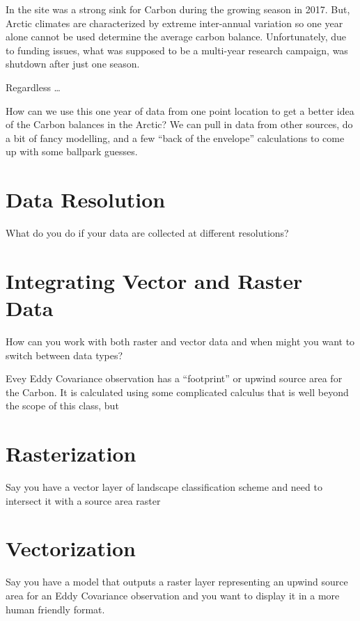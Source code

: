 \documentclass[
]{book}
\begin{document}
In the site was a strong sink for Carbon during the growing season in 2017. But, Arctic climates are characterized by extreme inter-annual variation so one year alone cannot be used determine the average carbon balance. Unfortunately, due to funding issues, what was supposed to be a multi-year research campaign, was shutdown after just one season.

Regardless \ldots{}

How can we use this one year of data from one point location to get a better idea of the Carbon balances in the Arctic? We can pull in data from other sources, do a bit of fancy modelling, and a few ``back of the envelope'' calculations to come up with some ballpark guesses.

\hypertarget{data-resolution}{%
\section{Data Resolution}\label{data-resolution}}

What do you do if your data are collected at different resolutions?

\hypertarget{integrating-vector-and-raster-data}{%
\section{Integrating Vector and Raster Data}\label{integrating-vector-and-raster-data}}

How can you work with both raster and vector data and when might you want to switch between data types?

Evey Eddy Covariance observation has a ``footprint'' or upwind source area for the Carbon. It is calculated using some complicated calculus that is well beyond the scope of this class, but

\hypertarget{rasterization}{%
\section{Rasterization}\label{rasterization}}

Say you have a vector layer of landscape classification scheme and need to intersect it with a source area raster

\hypertarget{vectorization}{%
\section{Vectorization}\label{vectorization}}

Say you have a model that outputs a raster layer representing an upwind source area for an Eddy Covariance observation and you want to display it in a more human friendly format.
\end{document}

